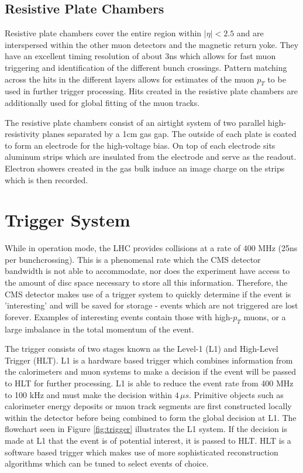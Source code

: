 \subsection{Resistive Plate Chambers}

Resistive plate chambers cover the entire region within $|\eta|<2.5$ and are interspersed within the other muon detectors and the magnetic return yoke. They have an excellent timing resolution of about 3ns which allows for fast muon triggering and identification of the different bunch crossings. Pattern matching across the hits in the different layers allows for estimates of the muon $p_{T}$ to be used in further trigger processing. Hits created in the resistive plate chambers are additionally used for global fitting of the muon tracks.

The resistive plate chambers consist of an airtight system of two parallel high-resistivity planes separated by a 1cm gas gap. The outside of each plate is coated to form an electrode for the high-voltage bias. On top of each electrode sits aluminum strips which are insulated from the electrode and serve as the readout. Electron showers created in the gas bulk induce an image charge on the strips which is then recorded.

\section{Trigger System}

While in operation mode, the LHC provides collisions at a rate of 400 MHz (25ns per bunchcrossing). This is a phenomenal rate which the CMS detector bandwidth is not able to accommodate, nor does the experiment have access to the amount of disc space necessary to store all this information. Therefore, the CMS detector makes use of a trigger system to quickly determine if the event is 'interesting' and will be saved for storage - events which are not triggered are lost forever. Examples of interesting events contain those with high-$p_{T}$ muons, or a large imbalance in the total momentum of the event.\cite{CMS-TRG-12-001}

The trigger consists of two stages known as the Level-1 (L1) and High-Level Trigger (HLT). L1 is a hardware based trigger which combines information from the calorimeters and muon systems to make a decision if the event will be passed to HLT for further processing. L1 is able to reduce the event rate from 400 MHz to 100 kHz and must make the decision within $4\,\mu s$. Primitive objects such as calorimeter energy deposits or muon track segments are first constructed locally within the detector before being combined to form the global decision at L1. The flowchart seen in Figure \ref{fig:trigger} illustrates the L1 system. If the decision is made at L1 that the event is of potential interest, it is passed to HLT. HLT is a software based trigger which makes use of more sophisticated reconstruction algorithms which can be tuned to select events of choice.

